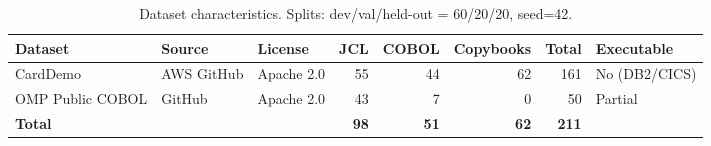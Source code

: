 \begin{table}[t]
\small
\centering
\caption{Dataset characteristics. Splits: dev/val/held-out = 60/20/20, seed=42.}
\label{table:datasets}
\begin{tabular}{lllrrrrl}
\toprule
Dataset & Source & License & JCL & COBOL & Copybooks & Total & Executable \\
\midrule
CardDemo & AWS GitHub & Apache 2.0 & 55 & 44 & 62 & 161 & No (DB2/CICS) \\
OMP Public COBOL & GitHub & Apache 2.0 & 43 & 7 & 0 & 50 & Partial \\
\midrule
\textbf{Total} & & & \textbf{98} & \textbf{51} & \textbf{62} & \textbf{211} & \\
\bottomrule
\end{tabular}
\end{table}
